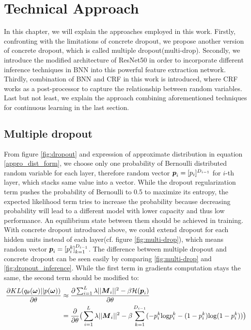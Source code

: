\chapter{Technical Approach}
In this chapter, we will explain the approaches employed in this work. Firstly, confronting with the limitations of concrete dropout, we propose another version of concrete dropout, which is called multiple dropout(multi-drop). Secondly, we introduce the modified architecture of ResNet50 in order to incorporate different inference techniques in BNN into this powerful feature extraction network. Thirdly, combination of BNN and CRF in this work is introduced, where CRF works as a post-processor to capture the relationship between random variables. Last but not least, we explain the approach combining aforementioned techniques for continuous learning in the last section.

\section{Multiple dropout}
From figure \ref{fig:dropout} and expression of approximate distribution in equation \ref{appro_dist_form}, we choose only one probability of Bernoulli distributed random variable for each layer, therefore random vector $\boldsymbol p_i = [p_i]^{D_{i-1}}$ for $i$-th layer, which stacks same value into a vector. While the dropout regularization term pushes the probability of Bernoulli to 0.5 to maximize its entropy, the expected likelihood term tries to increase the probability because decreasing probability will lead to a different model with lower capacity and thus low performance. An equilibrium state between them should be achieved in training. With concrete dropout introduced above, we could extend dropout for each hidden units instead of each layer(cf. figure \ref{fig:multi-drop}), which means random vector $\boldsymbol p_i = [p_i^k]_{k=1}^{D_{i-1}}$. The difference between multiple dropout and concrete dropout can be seen easily by comparing \ref{fig:multi-drop} and \ref{fig:dropout_inference}. While the first term in gradients computation stays the same, the second term should be modified to:
\begin{equation} 
\begin{aligned}\label{KL_grad_multi}
\frac{\partial KL(q_{\theta}(\boldsymbol \omega)||p(\boldsymbol \omega))}{\partial \theta} 
&\approx \frac{\partial \sum_{i=1}^{L}\lambda||\boldsymbol M_{i}||^{2}- \beta \mathcal H(\boldsymbol p_{i})}{\partial \theta}  \\
&= \frac{\partial}{\partial \theta} \big( \sum_{i=1}^{L}\lambda||\boldsymbol M_{i}||^{2}- \beta \sum_{k=1}^{D_{i-1}}(-p_i^k\text{log}p_i^k - (1-p_i^k)\text{log}(1-p_i^k))\big)
\end{aligned}
\end{equation}  

